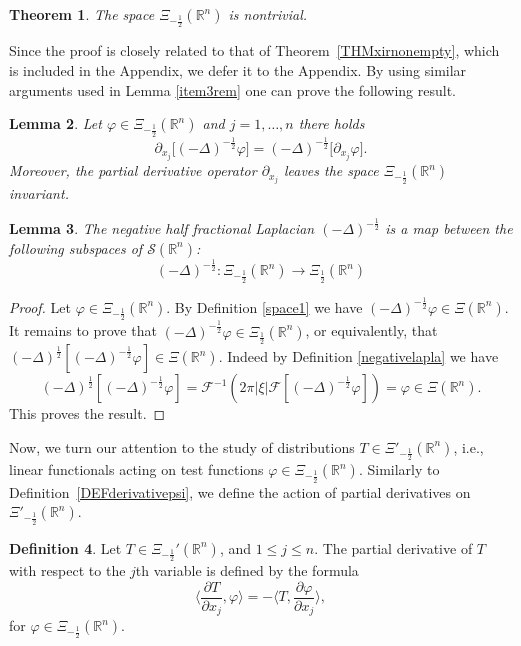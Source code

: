 \documentclass[reqno,11pt]{amsart}
\newtheorem{theorem}{Theorem}[section]
\newtheorem{lemma}[theorem]{Lemma}
\theoremstyle{definition}
\newtheorem{definition}[theorem]{Definition}
\def\R{\mathbb{R}}
\begin{document}
\begin{theorem}
\label{nonempty}
The space $\Xi_{-\frac{1}{2}}(\R^n)$ is nontrivial.
\end{theorem}

Since the proof is closely related to that of Theorem~\ref{THMxirnonempty}, which is included in the Appendix, we defer it to the Appendix.
By using similar arguments used in Lemma \ref{item3rem} one can prove the following result.
\begin{lemma}
\label{invariance}
Let $\varphi \in \Xi_{-\frac{1}{2}}(\mathbb{R}^n)$ and $j=1,\ldots,n$ there holds
$$\partial_{x_j}\big[(-\Delta)^{-\frac{1}{2}}\varphi\big] =(-\Delta)^{-\frac{1}{2}}\big[\partial_{x_j}\varphi\big].
$$ Moreover, the partial derivative operator $\partial_{x_j}$ leaves the space  $\Xi_{-\frac{1}{2}}(\R^n)$ invariant.
\end{lemma}


\begin{lemma}
\label{newneg0}
The negative half fractional Laplacian $(-\Delta)^{-\frac{1}{2}}$ is a  map between the following subspaces of $ \mathcal{S}(\mathbb{R}^n)$:
$$
(-\Delta)^{-\frac{1}{2}} : \Xi_{-\frac{1}{2}}(\mathbb{R}^n) \to \Xi_{\frac{1}{2}}(\mathbb{R}^n)
$$
\end{lemma}
\begin{proof}
Let $\varphi \in \Xi_{-\frac{1}{2}}(\mathbb{R}^n) $. By Definition \ref{space1} we have $(-\Delta)^{-\frac{1}{2}} \varphi \in \Xi(\mathbb{R}^n)$. It remains to prove that $(-\Delta)^{-\frac{1}{2}} \varphi \in \Xi_{{\frac{1}{2}}}(\mathbb{R}^n)$, or equivalently, that $(-\Delta)^{\frac{1}{2}} [(-\Delta)^{-\frac{1}{2}}\varphi] \in \Xi(\mathbb{R}^n)$. Indeed by Definition \ref{negativelapla} we have
$$(-\Delta)^{\frac{1}{2}} [(-\Delta)^{-\frac{1}{2}}\varphi]= \mathcal{F}^{-1}(2 \pi | \xi| \mathcal{F}[(-\Delta)^{-\frac{1}{2}}\varphi])=\varphi \in \Xi(\mathbb{R}^n).$$
This proves the result.
\end{proof}

Now, we turn our attention to the study of distributions  $T\in \Xi'_{-\frac{1}{2}}(\mathbb{R}^n)$, i.e., linear functionals acting on test functions $\varphi\in \Xi_{-\frac{1}{2}}(\mathbb{R}^n)$.
Similarly to Definition~\ref{DEFderivativepsi}, we define the action of partial derivatives on
$\Xi'_{-\frac{1}{2}}(\mathbb{R}^n)$.

\begin{definition}\label{derivative}
	Let $T\in  \Xi_{-\frac{1}{2}}'(\R^n)$, and $1\leq j\leq n$. The partial derivative of $T$ with respect to the $j$th variable is defined by the formula
	\[
	\bigg\langle \frac{\partial T}{\partial {x_j}},\varphi \bigg\rangle  = -\bigg\langle T, \frac{\partial \varphi}{\partial {x_j}} \bigg\rangle,
	\]
	for $\varphi\in \Xi_{-\frac{1}{2}}(\R^n)$.
\end{definition}
\end{document}
